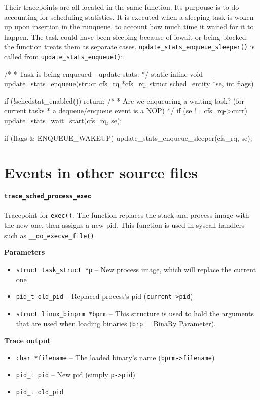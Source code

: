 Their tracepoints are all located in the same function. Its purpouse is to do accounting for scheduling statistics. It is executed when a sleeping task is woken up upon insertion in the runqueue, to account how much time it waited for it to happen. The task could have been sleeping because of iowait or being blocked: the function treats them as separate cases. \verb|update_stats_enqueue_sleeper()| is called from \verb|update_stats_enqueue()|:
\begin{code}
/*
 * Task is being enqueued - update stats:
 */
static inline void
update_stats_enqueue(struct cfs_rq *cfs_rq, struct sched_entity *se, int flags) {
	if (!schedstat_enabled())
		return;
	/*
	 * Are we enqueueing a waiting task? (for current tasks
	 * a dequeue/enqueue event is a NOP)
	 */
	if (se != cfs_rq->curr)
		update_stats_wait_start(cfs_rq, se);

	if (flags & ENQUEUE_WAKEUP)
		update_stats_enqueue_sleeper(cfs_rq, se);
}
\end{code}

\section{Events in other source files}
\paragraph{\texttt{trace\_sched\_process\_exec}}
Tracepoint for \verb|exec()|. The function replaces the stack and process image with the new one, then assigns a new pid. This function is used in syscall handlers such as \verb|__do_execve_file()|. 

\textbf{Parameters}
\begin{itemize}
    \item \verb|struct task_struct *p| -- New process image, which will replace the current one
    \item \verb|pid_t old_pid| -- Replaced process's pid (\verb|current->pid|)
    \item \verb|struct linux_binprm *bprm| -- This structure is used to hold the arguments that are used when loading binaries (\verb|brp| = BinaRy Parameter).
\end{itemize}

\textbf{Trace output}
\begin{itemize}
    \item \verb|char *filename| -- The loaded binary's name (\verb|bprm->filename|)
    \item \verb|pid_t pid| -- New pid (simply \verb|p->pid|)
    \item \verb|pid_t old_pid|
\end{itemize}

